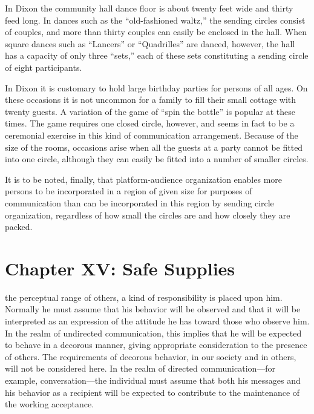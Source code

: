 \documentclass[twoside,symmetric,nobib,justified]{tufte-book}
\let\oldchapter\chapter
\def\chapter{%
  \setcounter{footnote}{0}%
  \oldchapter
}
\begin{document}
In Dixon the community hall dance floor is about twenty feet wide and
thirty feed long. In dances such as the ``old-fashioned waltz,'' the
sending circles consist of couples, and more than thirty couples can
easily be enclosed in the hall. When square dances such as ``Lancers''
or ``Quadrilles'' are danced, however, the hall has a capacity of only
three ``sets,'' each of these sets constituting a sending circle of
eight participants.

In Dixon it is customary to hold large birthday parties for persons of
all ages. On these occasions it is not uncommon for a family to fill
their small cottage with twenty guests. A variation of the game of
``spin the bottle'' is popular at these times. The game requires one
closed circle, however, and seems in fact to be a ceremonial exercise in
this kind of communication arrangement. Because of the size of the
rooms, occasions arise when all the guests at a party cannot be fitted
into one circle, although they can easily be fitted into a number of
smaller circles.

It is to be noted, finally, that platform-audience organization enables
more persons to be incorporated in a region of given size for purposes
of communication than can be incorporated in this region by sending
circle organization, regardless of how small the circles are and how
closely they are packed.


\chapter[CHAPTER XV: SAFE SUPPLIES]{Chapter XV: Safe Supplies}
\label{ch:Chapter XV: Safe Supplies}

 the perceptual range of others, a kind of
responsibility is placed upon him. Normally he must assume that his
behavior will be observed and that it will be interpreted as an
expression of the attitude he has toward those who observe him. In the
realm of undirected communication, this implies that he will be expected
to behave in a decorous manner, giving appropriate consideration to the
presence of others. The requirements of decorous behavior, in our
society and in others, will not be considered here. In the realm of
directed communication---for example, conversation---the individual must
assume that both his messages and his behavior as a recipient will be
expected to contribute to the maintenance of the working acceptance.
\end{document}

